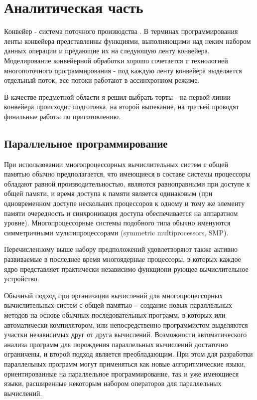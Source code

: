 \chapter{Аналитическая часть}

Конвейер - система поточного производства \cite{mednov}. В терминах программирования ленты конвейера представленны функциями, выполняющими над неким набором данных операции и предающие их на следующую ленту конвейера. Моделирование конвейерной обработки хорошо сочетается с технологией многопоточного программирования - под каждую ленту конвейера выделяется отдельный поток, все потоки работают в ассинхронном режиме.

В качестве предметной области я решил выбрать торты - на первой линии конвейера происходит подготовка, на второй выпекание, на третьей проводят финальные работы по приготовлению.



\section{Параллельное программирование}


При использовании многопроцессорных вычислительных систем с общей памятью обычно предполагается, что имеющиеся в составе системы процессоры обладают равной производительностью, являются равноправными при доступе к общей памяти, и время доступа к памяти является одинаковым (при одновременном доступе нескольких процессоров к одному и тому же элементу памяти очередность и синхронизация доступа обеспечивается на аппаратном уровне). Многопроцессорные системы подобного типа обычно именуются симметричными мультипроцессорами ({\ttfamily symmetric multiprocessors, SMP}).


Перечисленному выше набору предположений удовлетворяют также активно развиваемые в последнее время многоядерные процессоры, в которых каждое ядро представляет практически независимо функциони рующее вычислительное устройство.


Обычный подход при организации вычислений для многопроцессорных вычислительных систем с общей памятью – создание новых параллельных методов на основе обычных последовательных программ, в которых или автоматически компилятором, или непосредственно программистом выделяются участки независимых друг от друга вычислений. Возможности автоматического анализа программ для порождения параллельных вычислений достаточно ограничены, и второй подход является преобладающим. При этом для разработки параллельных программ могут применяться как новые алгоритмические языки, ориентированные на параллельное программирование, так и уже имеющиеся языки, расширенные некоторым набором операторов для параллельных вычислений.


